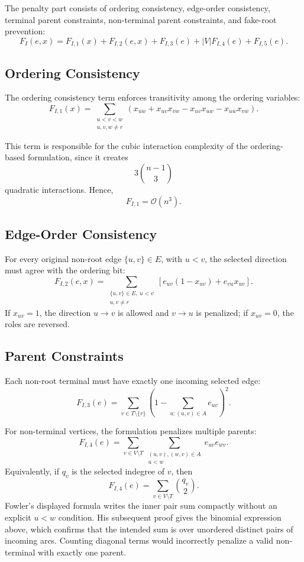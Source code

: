 \documentclass[a4paper,12pt]{report}
\begin{document}
The penalty part consists of ordering consistency, edge-order consistency, terminal parent constraints, non-terminal parent constraints, and fake-root prevention:
\[
F_I(e,x)
=
F_{I,1}(x)
+
F_{I,2}(e,x)
+
F_{I,3}(e)
+
|V|F_{I,4}(e)
+
F_{I,5}(e).
\]

\subsection{Ordering Consistency}

The ordering consistency term enforces transitivity among the ordering variables:
\[
F_{I,1}(x)
=
\sum_{\substack{u<v<w\\u,v,w\neq r}}
\left(
x_{uw}
+
x_{uv}x_{vw}
-
x_{uv}x_{uw}
-
x_{uw}x_{vw}
\right).
\]

This term is responsible for the cubic interaction complexity of the ordering-based formulation, since it creates
\[
3\binom{n-1}{3}
\]
quadratic interactions. Hence,
\[
F_{I,1}
=
\mathcal{O}(n^3).
\]

\subsection{Edge-Order Consistency}

For every original non-root edge \(\{u,v\}\in E\), with \(u<v\), the selected direction must agree with the ordering bit:
\[
F_{I,2}(e,x)
=
\sum_{\substack{\{u,v\}\in E,\ u<v\\u,v\neq r}}
\left[
e_{uv}(1-x_{uv})
+
e_{vu}x_{uv}
\right].
\]
If \(x_{uv}=1\), the direction \(u\to v\) is allowed and \(v\to u\) is penalized; if \(x_{uv}=0\), the roles are reversed.

\subsection{Parent Constraints}

Each non-root terminal must have exactly one incoming selected edge:
\[
F_{I,3}(e)
=
\sum_{v\in T\setminus\{r\}}
\left(
1-\sum_{u:(u,v)\in A} e_{uv}
\right)^2.
\]

For non-terminal vertices, the formulation penalizes multiple parents:
\[
F_{I,4}(e)
=
\sum_{v\in V\setminus T}
\sum_{\substack{(u,v),(w,v)\in A\\u<w}}
e_{uv}e_{wv}.
\]
Equivalently, if \(q_v\) is the selected indegree of \(v\), then
\[
F_{I,4}(e)
=
\sum_{v\in V\setminus T}\binom{q_v}{2}.
\]
Fowler's displayed formula writes the inner pair sum compactly without an explicit \(u<w\) condition. His subsequent proof gives the binomial expression above, which confirms that the intended sum is over unordered distinct pairs of incoming arcs. Counting diagonal terms would incorrectly penalize a valid non-terminal with exactly one parent.
\end{document}
